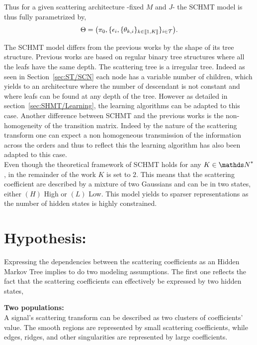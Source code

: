 \documentclass[a4paper,11pt]{report}
\begin{document}
		Thus for a given scattering architecture -\ie fixed $M$ and $J$- the SCHMT model is thus fully parametrized by,
		\begin{equation}
			\Theta = \big(\pi_{0}, \{ \epsilon_{i}, \{ \theta_{k,i} \}_{k\in\llbracket1,K\rrbracket} \}_{i\in\mathcal{T}}\big).
			\label{eq:SCHMT - parameters}
		\end{equation}
		
		
    The SCHMT model differs from the previous works by the shape of its tree structure. Previous works are based on regular binary tree structures where all the leafs have the same depth. The scattering tree is a irregular tree. Indeed as seen in Section~\ref{sec:ST/SCN} each node has a variable number of children, which yields to an architecture where the number of descendant is not constant and where leafs can be found at any depth of the tree. However as detailed in section~\ref{sec:SHMT/Learning}, the learning algorithms can be adapted to this case. Another difference between SCHMT and the previous works is the non-homogeneity of the transition matrix. Indeed by the nature of the scattering transform one can expect a non homogeneous transmission of the information across the orders and thus to reflect this the learning algorithm has also been adapted to this case.\\
    
    Even though the theoretical framework of SCHMT holds for any $K \in \dsN^{\ast}$, in the remainder of the work $K$ is set to $2$. This means that the scattering coefficient are described by a mixture of two Gaussians and can be in two states, either $(H)$ High or $(L)$ Low. This model yields to sparser representations as the number of hidden states is highly constrained.
    
    
  \section{Hypothesis:}
    \label{sec:SHMT/Hypos}
    
    Expressing the dependencies between the scattering coefficients as an Hidden Markov Tree implies to do two modeling assumptions. The first one reflects the fact that the scattering coefficients can effectively be expressed by two hidden states,\\
    
    \begin{assumption}\textbf{Two populations:}\\
			A signal's scattering transform can be described as two clusters of coefficients' value. The smooth regions are represented by small scattering coefficients, while edges, ridges, and other singularities are represented by large coefficients.\\
			\label{assum:2pop}
    \end{assumption}
    
\end{document}
